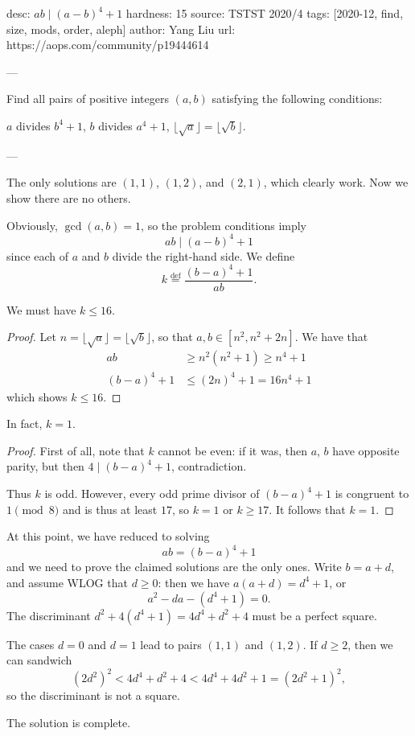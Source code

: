 desc: $ab \mid (a-b)^4+1$
hardness: 15
source: TSTST 2020/4
tags: [2020-12, find, size, mods, order, aleph]
author: Yang Liu
url: https://aops.com/community/p19444614

---

Find all pairs of positive integers $(a, b)$ satisfying
the following conditions:
\begin{enumerate}[(i)]
  \ii $a$ divides $b^4+1$,
  \ii $b$ divides $a^4+1$,
  \ii $\lfloor \sqrt{a} \rfloor = \lfloor \sqrt{b} \rfloor$.
\end{enumerate}

---

The only solutions are $(1, 1)$, $(1, 2)$, and $(2, 1)$,
which clearly work. Now we show there are no others.

Obviously, $\gcd(a,b) = 1$, so the problem conditions imply
\[ ab \mid (a-b)^4+1 \]
since each of $a$ and $b$ divide the right-hand side.
We define
\[ k \stackrel{\text{def}}{=} \frac{(b-a)^4 + 1}{ab}. \]

\begin{claim*}
  We must have $k \le 16$.
\end{claim*}
\begin{proof}
  Let $n = \lfloor \sqrt{a} \rfloor = \lfloor \sqrt{b} \rfloor$,
  so that $a,b \in [n^2, n^2+2n]$.
  We have that
  \begin{align*}
    ab &\ge n^2(n^2 + 1) \ge n^4 + 1 \\
    (b-a)^4+1 &\le (2n)^4+1 = 16n^4+1
  \end{align*}
  which shows $k \le 16$.
\end{proof}

\begin{claim*}
  In fact, $k = 1$.
\end{claim*}

\begin{proof}
  First of all, note that $k$ cannot be even:
  if it was, then $a$, $b$ have opposite parity,
  but then $4 \mid (b-a)^4 + 1$, contradiction.

  Thus $k$ is odd. However, every odd prime divisor of $(b-a)^4 + 1$
  is congruent to $1 \pmod{8}$ and is thus at least $17$,
  so $k = 1$ or $k \ge 17$.
  It follows that $k = 1$.
\end{proof}

At this point, we have reduced to solving
\[ ab = (b-a)^4+1 \]
and we need to prove the claimed solutions are the only ones.
Write $b = a+d$, and assume WLOG that $d \ge 0$:
then we have $a(a+d) = d^4 + 1$, or
\[ a^2 - da - (d^4 + 1) = 0. \]
The discriminant $d^2 + 4(d^4 + 1)
= 4d^4 + d^2 + 4$ must be a perfect square.
\begin{itemize}
\ii The cases $d = 0$ and $d = 1$ lead to pairs $(1, 1)$ and $(1, 2)$.
\ii If $d \ge 2$, then we can sandwich
\[
  (2d^2)^2 < 4d^4 + d^2 + 4
  < 4d^4 + 4d^2 + 1 = (2d^2 + 1)^2,
\]
so the discriminant is not a square.
\end{itemize}
The solution is complete.

